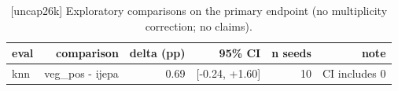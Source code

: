 \begin{table}[t]
\centering
\small
\caption{[uncap26k] Exploratory comparisons on the primary endpoint (no multiplicity correction; no claims).}
\label{tab:exploratory_comparisons}
\begin{tabular}{lrrrrr}
\toprule
eval & comparison & delta (pp) & 95\% CI & n seeds & note \\
\midrule
knn & veg\_pos - ijepa & 0.69 & [-0.24, +1.60] & 10 & CI includes 0 \\
\bottomrule
\end{tabular}
\end{table}

